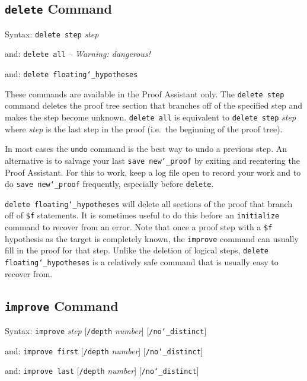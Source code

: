 \subsection{\texttt{delete} Command}
Syntax:  \texttt{delete step} {\em step}

   and:      \texttt{delete all} -- {\em Warning: dangerous!}

   and:      \texttt{delete floating{\char`\_}hypotheses}

These commands are available in the Proof Assistant only.  The
\texttt{delete step} command deletes the proof tree section that
branches off of the specified step and makes the step become unknown.
\texttt{delete all} is equivalent to \texttt{delete step} {\em step}
where {\em step} is the last step in the proof (i.e.\ the beginning of
the proof tree).

In most cases the \texttt{undo} command is the best way to undo
a previous step.
An alternative is to salvage your last \texttt{save
new{\char`\_}proof} by exiting and reentering the Proof Assistant.
For this to work, keep a log file open to record your work
and to do \texttt{save new{\char`\_}proof} frequently, especially before
\texttt{delete}.

\texttt{delete floating{\char`\_}hypotheses} will delete all sections of
the proof that branch off of \texttt{\$f}
statements.  It is sometimes useful to do this before an
\texttt{initialize} command to recover from an error.  Note that once a
proof step with a \texttt{\$f} hypothesis as the target is completely
known, the \texttt{improve} command can usually fill in the proof for
that step.  Unlike the deletion of logical steps, \texttt{delete
floating{\char`\_}hypotheses} is a relatively safe command that is
usually easy to recover from.



\subsection{\texttt{improve} Command}
\label{improve}
Syntax:  \texttt{improve} {\em step} [\texttt{/depth} {\em number}]
                                               [\texttt{/no{\char`\_}distinct}]

   and:   \texttt{improve first} [\texttt{/depth} {\em number}]
                                              [\texttt{/no{\char`\_}distinct}]

   and:   \texttt{improve last} [\texttt{/depth} {\em number}]
                                              [\texttt{/no{\char`\_}distinct}]

